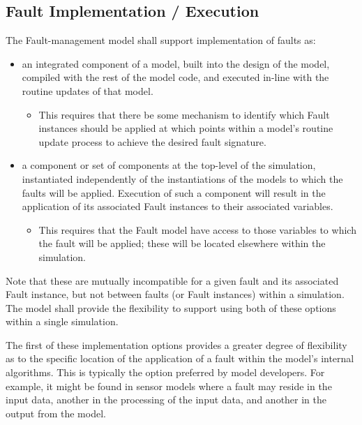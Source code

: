 \documentclass[11pt,fleqn]{report}
\begin{document}
\subsection{Fault Implementation / Execution}
The Fault-management model shall support implementation of faults as:
\begin{itemize}
 \item an integrated component of a model, built into the
 design of the model, compiled with the rest of the model code, and executed
 in-line with the routine updates of that model.
 \begin{itemize}
  \item This requires that there be some
  mechanism to identify which Fault instances should be applied at which
  points within a model's routine update process to achieve the desired
  fault signature.
 \end{itemize}
 \item a component or set of components at the top-level of the simulation,
 instantiated independently of the instantiations of the models to which
 the faults will be applied. Execution of
 such a component will result in the application of its associated Fault
 instances to their associated variables.
 \begin{itemize}
  \item This requires that the Fault model have access to those variables to
  which the fault will be applied; these will be located elsewhere within
  the simulation.
 \end{itemize}
\end{itemize}

Note that these are mutually incompatible for a given fault and its
associated Fault instance, but not between faults (or Fault instances)
within a simulation. The model shall provide the flexibility to support
using both of these options within a single simulation.

The first of these implementation options provides a greater degree of
flexibility as to
the specific location of the application of a fault within the model's internal
algorithms. This is typically the option preferred by model developers. For
example, it might be found in sensor models where a fault may reside
in the input data, another in the processing of the input data, and another in
the output from the model.
\end{document}
